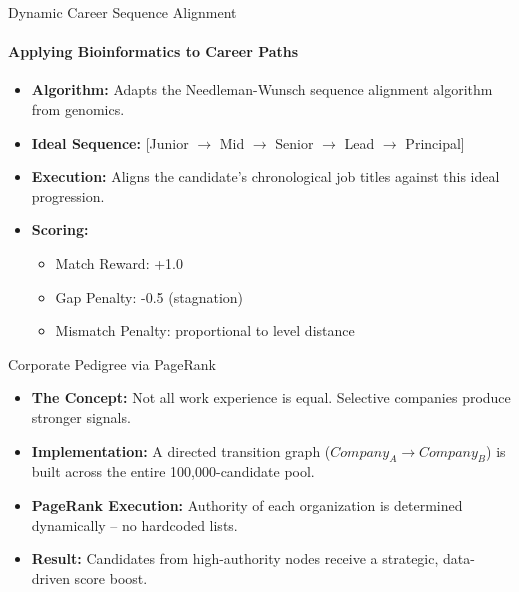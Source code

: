 \documentclass[aspectratio=169]{beamer}
\begin{document}
\begin{frame}{Dynamic Career Sequence Alignment}
  \framesubtitle{Applying Bioinformatics to Career Paths}
  \begin{itemize}
    \item \textbf{Algorithm:} Adapts the Needleman-Wunsch sequence alignment algorithm from genomics.
    \item \textbf{Ideal Sequence:} [Junior $\rightarrow$ Mid $\rightarrow$ Senior $\rightarrow$ Lead $\rightarrow$ Principal]
    \item \textbf{Execution:} Aligns the candidate's chronological job titles against this ideal progression.
    \item \textbf{Scoring:}
    \begin{itemize}
      \item Match Reward: +1.0
      \item Gap Penalty: -0.5 (stagnation)
      \item Mismatch Penalty: proportional to level distance
    \end{itemize}
  \end{itemize}
\end{frame}

\begin{frame}{Corporate Pedigree via PageRank}
  \begin{itemize}
    \item \textbf{The Concept:} Not all work experience is equal. Selective companies produce stronger signals.
    \item \textbf{Implementation:} A directed transition graph ($Company_A \rightarrow Company_B$) is built across the entire 100,000-candidate pool.
    \item \textbf{PageRank Execution:} Authority of each organization is determined dynamically -- no hardcoded lists.
    \item \textbf{Result:} Candidates from high-authority nodes receive a strategic, data-driven score boost.
  \end{itemize}
\end{frame}
\end{document}
